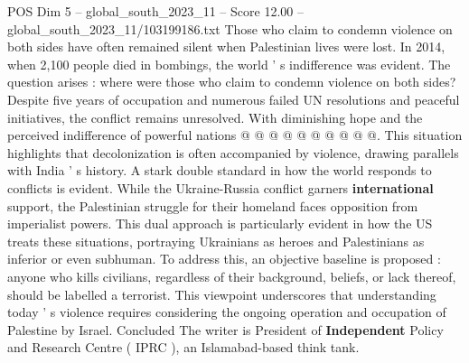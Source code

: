 \begin{textsample}{POS Dim 5 – global\_south\_2023\_11 – Score 12.00 – global\_south\_2023\_11/103199186.txt}
Those who claim to condemn violence on both sides have often remained silent when Palestinian lives were lost.
In 2014, when 2,100 people died in bombings, the world ' s indifference was evident.
The question arises : where were those who claim to condemn violence on both sides?
Despite five years of occupation and numerous failed UN resolutions and peaceful initiatives, the conflict remains unresolved.
With diminishing hope and the perceived indifference of powerful nations @ @ @ @ @ @ @ @ @ @.
This situation highlights that decolonization is often accompanied by violence, drawing parallels with India ' s history.
A stark double standard in how the world responds to conflicts is evident.
While the Ukraine-Russia conflict garners \textbf{international} support, the Palestinian struggle for their homeland faces opposition from imperialist powers.
This dual approach is particularly evident in how the US treats these situations, portraying Ukrainians as heroes and Palestinians as inferior or even subhuman.
To address this, an objective baseline is proposed : anyone who kills civilians, regardless of their background, beliefs, or lack thereof, should be labelled a terrorist.
This viewpoint underscores that understanding today ' s violence requires considering the ongoing operation and occupation of Palestine by Israel.
Concluded The writer is President of \textbf{Independent} Policy and Research Centre ( IPRC ), an Islamabad-based think tank.

\end{textsample}
